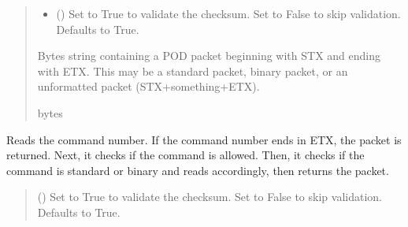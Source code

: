 \documentclass[letterpaper,10pt,english]{sphinxmanual}
\begin{document}
\begin{fulllineitems}
\begin{fulllineitems}
\begin{quote}
\begin{description}
\begin{itemize}
\item {} 
\sphinxAtStartPar
{} (\sphinxstyleliteralemphasis{\sphinxupquote{, }}) \textendash{} Set to True to validate the checksum. Set to False to skip                     validation. Defaults to True.

\end{itemize}

\sphinxAtStartPar
Bytes string containing a POD packet beginning with STX and ending with ETX. This may                 be a standard packet, binary packet, or an unformatted packet (STX+something+ETX).

\sphinxAtStartPar
bytes

\end{description}\end{quote}

\end{fulllineitems}


\begin{fulllineitems}
\label{\detokenize{BasicPodProtocol:BasicPodProtocol.POD_Basics._ReadPODpacket_Recursive}}
\pysigstartsignatures
{}
\pysigstopsignatures
\sphinxAtStartPar
Reads the command number. If the command number ends in ETX, the packet is returned.         Next, it checks if the command is allowed. Then, it checks if the command is standard or         binary and reads accordingly, then returns the packet.
\begin{quote}\begin{description}
\sphinxAtStartPar
{} (\sphinxstyleliteralemphasis{\sphinxupquote{, }}) \textendash{} Set to True to validate the checksum. Set to False to                 skip validation. Defaults to True.


\end{description}
\end{quote}
\end{fulllineitems}
\end{fulllineitems}
\end{document}
